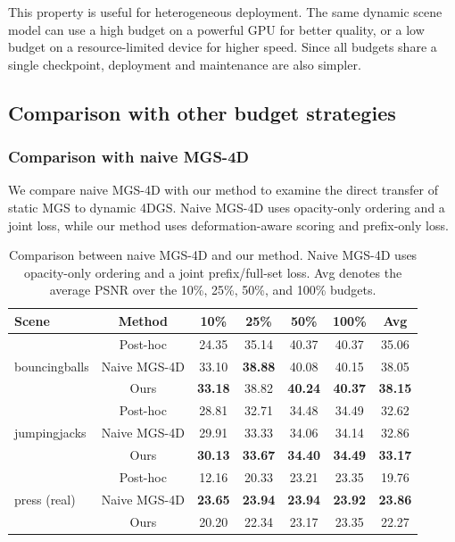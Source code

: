 \documentclass[pdflatex,sn-mathphys]{sn-jnl}
\begin{document}
This property is useful for heterogeneous deployment. The same dynamic scene model can use a high budget on a powerful GPU for better quality, or a low budget on a resource-limited device for higher speed. Since all budgets share a single checkpoint, deployment and maintenance are also simpler.

\subsection{Comparison with other budget strategies}
\label{sec:comparisons}

\subsubsection{Comparison with naive MGS-4D}

We compare naive MGS-4D with our method to examine the direct transfer of static MGS to dynamic 4DGS. Naive MGS-4D uses opacity-only ordering and a joint loss, while our method uses deformation-aware scoring and prefix-only loss.

\begin{table}[!htbp]
\caption{Comparison between naive MGS-4D and our method. Naive MGS-4D uses opacity-only ordering and a joint prefix/full-set loss. Avg denotes the average PSNR over the 10\%, 25\%, 50\%, and 100\% budgets.}
\label{tab:naive_mgs}
\centering
\small
\setlength{\tabcolsep}{4pt}
\begin{tabular}{lcccccc}
\toprule
Scene & Method & 10\% & 25\% & 50\% & 100\% & Avg \\
\midrule
\multirow{3}{*}{bouncingballs} & Post-hoc   & 24.35 & 35.14 & 40.37 & 40.37 & 35.06 \\
& Naive MGS-4D & 33.10 & \textbf{38.88} & 40.08 & 40.15 & 38.05 \\
& Ours      & \textbf{33.18} & 38.82 & \textbf{40.24} & \textbf{40.37} & \textbf{38.15} \\
\midrule
\multirow{3}{*}{jumpingjacks} & Post-hoc   & 28.81 & 32.71 & 34.48 & 34.49 & 32.62 \\
& Naive MGS-4D & 29.91 & 33.33 & 34.06 & 34.14 & 32.86 \\
& Ours      & \textbf{30.13} & \textbf{33.67} & \textbf{34.40} & \textbf{34.49} & \textbf{33.17} \\
\midrule
\multirow{3}{*}{press (real)} & Post-hoc   & 12.16 & 20.33 & 23.21 & 23.35 & 19.76 \\
& Naive MGS-4D & \textbf{23.65} & \textbf{23.94} & \textbf{23.94} & \textbf{23.92} & \textbf{23.86} \\
& Ours      & 20.20 & 22.34 & 23.17 & 23.35 & 22.27 \\
\bottomrule
\end{tabular}
\end{table}
\end{document}
